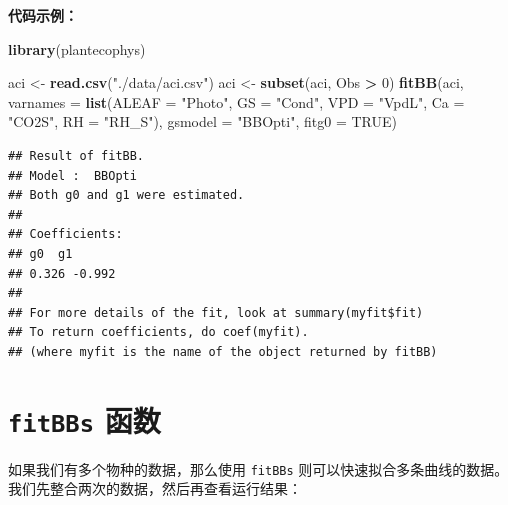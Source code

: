 \documentclass[
]{krantz}
\makeatletter
\newenvironment{Shaded}{\begin{snugshade}}{\end{snugshade}}
\newcommand{\DataTypeTok}[1]{\textcolor[rgb]{0.13,0.29,0.53}{#1}}
\newcommand{\DecValTok}[1]{\textcolor[rgb]{0.00,0.00,0.81}{#1}}
\newcommand{\KeywordTok}[1]{\textcolor[rgb]{0.13,0.29,0.53}{\textbf{#1}}}
\newcommand{\NormalTok}[1]{#1}
\newcommand{\OperatorTok}[1]{\textcolor[rgb]{0.81,0.36,0.00}{\textbf{#1}}}
\newcommand{\OtherTok}[1]{\textcolor[rgb]{0.56,0.35,0.01}{#1}}
\newcommand{\StringTok}[1]{\textcolor[rgb]{0.31,0.60,0.02}{#1}}
\newenvironment{kframe}{%
\medskip{}
\setlength{\fboxsep}{.8em}
 \def\at@end@of@kframe{}%
 \ifinner\ifhmode%
  \def\at@end@of@kframe{\end{minipage}}%
  \begin{minipage}{\columnwidth}%
 \fi\fi%
 \def\FrameCommand##1{\hskip\@totalleftmargin \hskip-\fboxsep
 \colorbox{shadecolor}{##1}\hskip-\fboxsep
     \hskip-\linewidth \hskip-\@totalleftmargin \hskip\columnwidth}%
 \MakeFramed {\advance\hsize-\width
   \@totalleftmargin\z@ \linewidth\hsize
   \@setminipage}}%
 {\par\unskip\endMakeFramed%
 \at@end@of@kframe}
\renewenvironment{Shaded}{\begin{kframe}}{\end{kframe}}
\makeatother
\begin{document}
\textbf{代码示例：}

\begin{Shaded}
\begin{Highlighting}[]
\KeywordTok{library}\NormalTok{(plantecophys)}

\NormalTok{aci \textless{}{-}}\StringTok{ }\KeywordTok{read.csv}\NormalTok{(}\StringTok{"./data/aci.csv"}\NormalTok{)}
\NormalTok{aci \textless{}{-}}\StringTok{ }\KeywordTok{subset}\NormalTok{(aci, Obs }\OperatorTok{\textgreater{}}\StringTok{ }\DecValTok{0}\NormalTok{)}
\KeywordTok{fitBB}\NormalTok{(aci, }\DataTypeTok{varnames =} \KeywordTok{list}\NormalTok{(}\DataTypeTok{ALEAF =} \StringTok{"Photo"}\NormalTok{, }\DataTypeTok{GS =} \StringTok{"Cond"}\NormalTok{, }\DataTypeTok{VPD =} \StringTok{"VpdL"}\NormalTok{,}
  \DataTypeTok{Ca =} \StringTok{"CO2S"}\NormalTok{, }\DataTypeTok{RH =} \StringTok{"RH\_S"}\NormalTok{), }\DataTypeTok{gsmodel =} \StringTok{"BBOpti"}\NormalTok{, }\DataTypeTok{fitg0 =} \OtherTok{TRUE}\NormalTok{)}
\end{Highlighting}
\end{Shaded}

\begin{verbatim}
## Result of fitBB.
## Model :  BBOpti 
## Both g0 and g1 were estimated.
## 
## Coefficients:
## g0  g1
## 0.326 -0.992 
## 
## For more details of the fit, look at summary(myfit$fit)
## To return coefficients, do coef(myfit).
## (where myfit is the name of the object returned by fitBB)
\end{verbatim}

\hypertarget{fitbbs}{%
\section{\texorpdfstring{\texttt{fitBBs} 函数}{fitBBs 函数}}\label{fitbbs}}

如果我们有多个物种的数据，那么使用 \texttt{fitBBs} 则可以快速拟合多条曲线的数据。我们先整合两次的数据，然后再查看运行结果：
\end{document}
